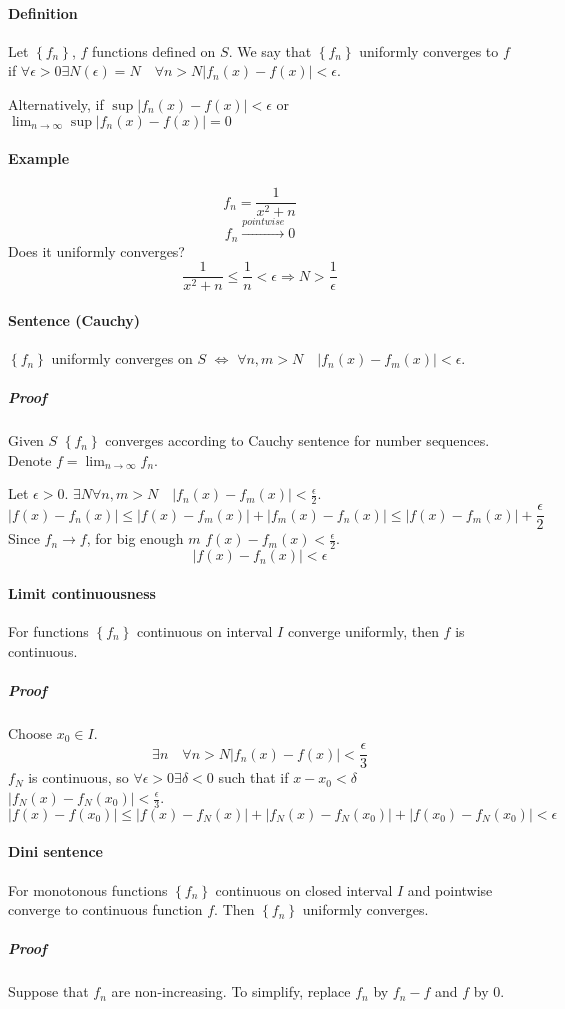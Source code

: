 \paragraph{Definition}
Let $\left\{ f_n \right\}$, $f$ functions defined on $S$. We say that  $\left\{ f_n \right\}$ uniformly converges to $f$ if $\forall \epsilon > 0 \exists N(\epsilon)=N \quad\forall n > N |f_n(x)-f(x)| < \epsilon $.

Alternatively, if $\sup |f_n(x)-f(x)| < \epsilon$ or $\lim_{n\to \infty} \sup |f_n(x)-f(x)| = 0$

\paragraph{Example}
$$f_n = \frac{1}{x^2+n}$$
$$f_n \stackrel{pointwise}{\to} 0$$
Does it uniformly converges?
$$\frac{1}{x^2+n} \leq \frac{1}{n} < \epsilon \Rightarrow N > \frac{1}{\epsilon}$$
\paragraph{Sentence (Cauchy)}
$\left\{f_n\right\}$ uniformly converges on $S$ $\iff$ $\forall n,m > N \quad \big|f_n(x)-f_m(x)\big| < \epsilon$.
\subparagraph{Proof} 
Given $S$ $\left\{f_n\right\}$ converges according to Cauchy sentence for number sequences.
Denote $f = \lim_{n \to \infty} f_n$.

Let $\epsilon > 0$. $\exists N \forall n,m > N \quad |f_n(x) -f_m(x)| < \frac{\epsilon}{2}$.
$$\left| f(x)-f_n(x) \right| \leq \left| f(x)-f_m(x) \right|+\left| f_m(x)-f_n(x) \right| \leq \left| f(x)-f_m(x) \right|+ \frac{\epsilon}{2}$$
Since $f_n \to f$, for big enough $m$ $f(x) - f_m(x) < \frac{\epsilon}{2}$. 
$$\left| f(x)-f_n(x) \right|< \epsilon$$
\paragraph{Limit continuousness}
For functions  $\left\{f_n\right\}$  continuous on interval $I$ converge uniformly, then $f$ is continuous.
\subparagraph{Proof}
Choose $x_0\in I$. $$\exists n \quad \forall n > N |f_n(x) - f(x)| < \frac{\epsilon}{3}$$ 
$f_N$ is continuous, so $\forall \epsilon >0 \exists \delta < 0$ such that if  $x-x_0 < \delta$ $|f_N(x)-f_N(x_0)| < \frac{\epsilon}{3}$.
$$|f(x) - f(x_0) |  \leq |f(x) - f_N(x) |+|f_N(x) - f_N(x_0) |+|f(x_0) - f_N(x_0) | < \epsilon$$
\paragraph{Dini sentence}
For monotonous functions  $\left\{f_n\right\}$  continuous on closed interval $I$ and pointwise converge to continuous function $f$. Then $\left\{f_n\right\}$  uniformly converges.
\subparagraph{Proof}
Suppose that $f_n$ are non-increasing. To simplify, replace $f_n$ by $f_n-f$ and $f$ by $0$.

